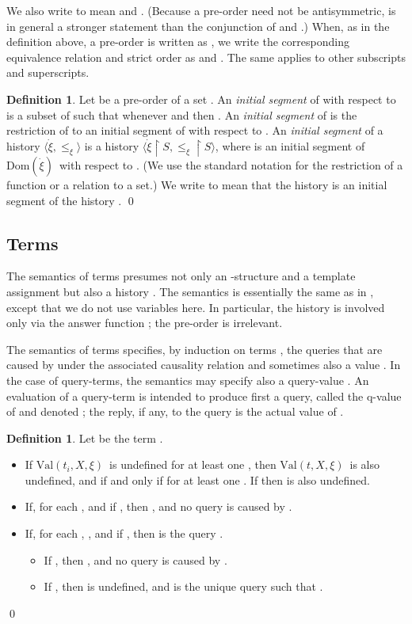 \documentclass{LMCS}
\theoremstyle{definition}
\newtheorem{df}[thm]{Definition}
\newenvironment{ls}{\begin{itemize}}{\end{itemize}}
\newcommand{\ans}{\dot}
\newcommand{\dom}[1]{\ensuremath{{\text{Dom}}(#1)}}
\newcommand{\restr}{\mathop{\upharpoonright}}
\newcommand{\sq}[1]{\ensuremath{\langle#1\rangle}}
\newcommand{\val}[3]{\ensuremath{\text{Val}(#1,#2,#3)}}
\begin{document}
We also write  to mean  and .  (Because a
pre-order need not be antisymmetric,  is in general a stronger
statement than the conjunction of  and .)  When,
as in the definition above, a pre-order is written as , we
write the corresponding equivalence relation and strict order as
 and .  The same applies to other subscripts and
superscripts.

\begin{df}
Let  be a pre-order of a set .  An \emph{initial segment}
of  with respect to  is a subset  of  such that
whenever  and  then .  An \emph{initial
segment} of  is the restriction of  to an initial
segment of  with respect to .  An \emph{initial segment} of
a history \sq{{\ans\xi},\leq_\xi} is a history \sq{{\ans\xi}\restr
S,\leq_\xi\restr S}, where  is an initial segment of
\dom{\ans\xi}\ with respect to .  (We use the standard
notation  for the restriction of a function or a relation to
a set.)  We write  to mean that the history 
is an initial segment of the history . \qed\end{df}


\subsection{Terms}

The semantics of terms presumes not only an -structure  and a
template assignment but also a history .  The semantics is
essentially the same as in \cite{oa2}, except that we do not use variables
here.  In particular, the history  is involved only via the answer
function ; the pre-order is irrelevant.

The semantics of terms specifies, by induction on terms , the queries
that are caused by  under the associated causality relation
 and sometimes also a value .  In the case of
query-terms, the semantics may specify also a query-value .
An evaluation of a query-term  is intended to produce first a query,
called the q-value of  and denoted ; the reply, if any, to
the query is the actual value  of .

\begin{df}   \label{term-val-def}
  Let  be the term .
  \begin{ls}

   \item If \val{t_i}X\xi\ is undefined for at least one , then
    \val tX\xi\ is also undefined, and  if and only
    if  for at least one . If  then  is also undefined.

   \item If, for each ,  and if ,
    then , and no query  is
    caused by .

   \item If, for each , , and if , then
     is the query .

   \begin{ls}

    \item If , then , and no query is caused by .

    \item If , then  is
    undefined, and  is the unique query such that .
    \end{ls}
  \end{ls}
\qed\end{df}
\end{document}
